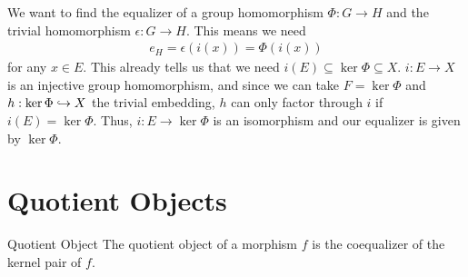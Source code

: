 \begin{example}
	We want to find the equalizer of a group homomorphism $\Phi : G \to H$ and the trivial homomorphism $\epsilon : G \to H$. This means we need
	\begin{align*}
		e_H = \epsilon(i(x)) = \Phi(i(x))
	\end{align*}
	for any $x \in E$. This already tells us that we need $i(E) \subseteq \ker \Phi \subseteq X$. $i : E \to X$ is an injective group homomorphism, and since we can take $F = \ker \Phi$ and $h : \ker \Phi \hookrightarrow X$ the trivial embedding, $h$ can only factor through $i$ if $i(E) = \ker \Phi$. Thus, $i : E \to \ker \Phi$ is an isomorphism and our equalizer is given by $\ker \Phi$.
\end{example}
\section{Quotient Objects}
\begin{importantdefinition}{Quotient Object}{}
	The quotient object of a morphism $f$ is the coequalizer of the kernel pair of $f$.
\end{importantdefinition}